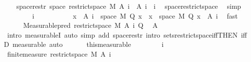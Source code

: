 \begin{isabellebody}
\ \ \isamarkupfalse%
\ space{\isacharunderscore}{\kern0pt}restr{\isacharcolon}{\kern0pt}\ {\isachardoublequoteopen}space\ {\isacharparenleft}{\kern0pt}restrict{\isacharunderscore}{\kern0pt}space\ M\ {\isacharparenleft}{\kern0pt}A\ i{\isacharparenright}{\kern0pt}{\isacharparenright}{\kern0pt}\ {\isacharequal}{\kern0pt}\ A\ i{\isachardoublequoteclose}\ \ i\ \isamarkupfalse%
\ space{\isacharunderscore}{\kern0pt}restrict{\isacharunderscore}{\kern0pt}space\ \isamarkupfalse%
\ simp\isanewline
\ \ \isacommand{{\isacharbraceleft}{\kern0pt}}\isamarkupfalse%
\isanewline
\ \ \ \ \isamarkupfalse%
\ i\ \ \ \ \isanewline
\ \ \ \ \isamarkupfalse%
\ {\isacharasterisk}{\kern0pt}{\isacharcolon}{\kern0pt}\ {\isachardoublequoteopen}{\isacharbraceleft}{\kern0pt}x\ {\isasymin}\ A\ i\ {\isasyminter}\ space\ M{\isachardot}{\kern0pt}\ Q\ x{\isacharbraceright}{\kern0pt}\ {\isacharequal}{\kern0pt}\ {\isacharbraceleft}{\kern0pt}x\ {\isasymin}\ space\ M{\isachardot}{\kern0pt}\ Q\ x{\isacharbraceright}{\kern0pt}\ {\isasyminter}\ {\isacharparenleft}{\kern0pt}A\ i{\isacharparenright}{\kern0pt}{\isachardoublequoteclose}\ \isamarkupfalse%
\ fast\isanewline
\ \ \ \ \isamarkupfalse%
\ {\isachardoublequoteopen}Measurable{\isachardot}{\kern0pt}pred\ {\isacharparenleft}{\kern0pt}restrict{\isacharunderscore}{\kern0pt}space\ M\ {\isacharparenleft}{\kern0pt}A\ i{\isacharparenright}{\kern0pt}{\isacharparenright}{\kern0pt}\ Q{\isachardoublequoteclose}\ \isamarkupfalse%
\ A\ \isamarkupfalse%
\ {\isacharparenleft}{\kern0pt}intro\ measurableI{\isacharcomma}{\kern0pt}\ auto\ simp\ add{\isacharcolon}{\kern0pt}\ space{\isacharunderscore}{\kern0pt}restr\ intro{\isacharbang}{\kern0pt}{\isacharcolon}{\kern0pt}\ sets{\isacharunderscore}{\kern0pt}restrict{\isacharunderscore}{\kern0pt}space{\isacharunderscore}{\kern0pt}iff{\isacharbrackleft}{\kern0pt}THEN\ iffD{}{\isacharbrackright}{\kern0pt}{\isacharcomma}{\kern0pt}\ measurable{\isacharcomma}{\kern0pt}\ auto{\isacharparenright}{\kern0pt}\isanewline
\ \ \isacommand{{\isacharbraceright}{\kern0pt}}\isamarkupfalse%
\isanewline
\ \ \isamarkupfalse%
\ this{\isacharbrackleft}{\kern0pt}measurable{\isacharbrackright}{\kern0pt}\isanewline
\ \ \isacommand{{\isacharbraceleft}{\kern0pt}}\isamarkupfalse%
\isanewline
\ \ \ \ \isamarkupfalse%
\ i\isanewline
\ \ \ \ \isamarkupfalse%
\ {\isachardoublequoteopen}finite{\isacharunderscore}{\kern0pt}measure\ {\isacharparenleft}{\kern0pt}restrict{\isacharunderscore}{\kern0pt}space\ M\ {\isacharparenleft}{\kern0pt}A\ i{\isacharparenright}{\kern0pt}{\isacharparenright}{\kern0pt}{\isachardoublequoteclose}\ \isamarkupfalse%

\end{isabellebody}
